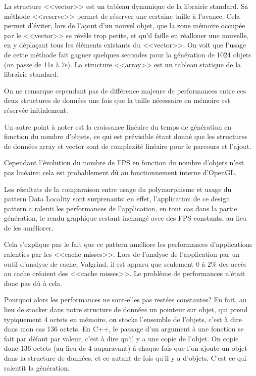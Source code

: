 \documentclass[a4paper,french,12pt]{article}
\begin{document}
	La structure <<vector>> est un tableau dynamique de la librairie standard.
	Sa méthode <<reserve>> permet de réserver une certaine taille à l'avance. Cela permet d'éviter, lors de l'ajout
	d'un nouvel objet, que la zone mémoire occupée par le <<vector>> se révèle trop petite, et qu'il faille en
	réallouer une nouvelle, en y déplaçant tous les éléments existants du <<vector>>. On voit que l'usage de cette méthode
	fait gagner quelques secondes pour la génération de 1024 objets (on passe de 11s à 7s).
	La structure <<array>> est un tableau statique de la librairie standard.

	On ne remarque cependant pas de différence majeure de performances entre ces deux structures de données une fois
	que la taille nécessaire en mémoire est réservée initialement.

	Un autre point à noter est la croissance linéaire du temps de génération en fonction du nombre d'objets, ce qui
	est prévisible étant donné que les structures de données array et vector sont de complexité linéaire pour le parcours
	et l'ajout.

	Cependant l'évolution du nombre de FPS en fonction du nombre d'objets n'est pas linéaire: cela est probablement
	dû au fonctionnement interne d'OpenGL.

	Les résultats de la comparaison entre usage du polymorphisme et usage du pattern Data Locality
	sont surprenants: en effet, l'application de ce design pattern a ralenti les performances
	de l'application, en tout cas dans la partie génération, le rendu graphique restant inchangé avec
	      des FPS constants, au lieu de les améliorer.

	      Cela s'explique par le fait que ce pattern améliore les performances d'applications ralenties par les
	      <<cache misses>>. Lors de l'analyse de l'application par un outil d'analyse de cache, Valgrind, il est
	      apparu que seulement 0 à 2\% des accès au cache créaient des <<cache misses>>. Le problème de performances
	      n'était donc pas dû à cela.

	      Pourquoi alors les performances ne sont-elles pas restées constantes? En fait, au lieu de stocker dans notre
	      structure de données un pointeur sur objet, qui prend typiquement 4 octets en mémoire, on stocke
	      l'ensemble de l'objets, c'est à dire dans mon cas 136 octets. En C++, le passage d'un argument
	      à une fonction se fait par défaut par valeur, c'est à dire qu'il y a une copie de l'objet.
	      On copie donc 136 octets (au lieu de 4 auparavant) à chaque fois que l'on ajoute un objet dans la structure de données, et ce
	      autant de fois qu'il y a d'objets. C'est ce qui ralentit la génération.
\end{document}
